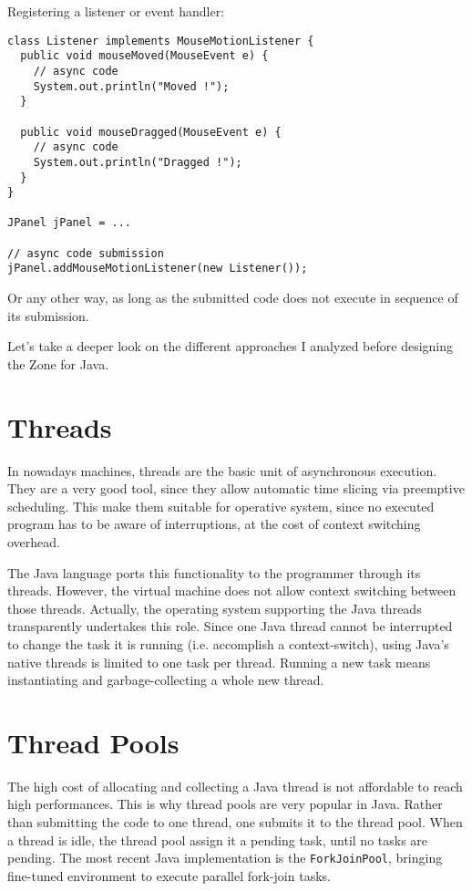 Registering a listener or event handler:
\begin{lstlisting}
class Listener implements MouseMotionListener {
  public void mouseMoved(MouseEvent e) {
    // async code
    System.out.println("Moved !");
  }

  public void mouseDragged(MouseEvent e) {
    // async code
    System.out.println("Dragged !");
  }
}

JPanel jPanel = ...

// async code submission
jPanel.addMouseMotionListener(new Listener());
\end{lstlisting}

Or any other way, as long as the submitted code does not execute in sequence of its submission.

Let's take a deeper look on the different approaches I analyzed before designing the Zone for Java.


\section{Threads}

In nowadays machines, threads are the basic unit of asynchronous execution. They are a very good tool, since they allow automatic time slicing via preemptive scheduling. This make them suitable for operative system, since no executed program has to be aware of interruptions, at the cost of context switching overhead.

The Java language ports this functionality to the programmer through its threads. However, the virtual machine does not allow context switching between those threads. Actually, the operating system supporting the Java threads transparently undertakes this role. Since one Java thread cannot be interrupted to change the task it is running (i.e. accomplish a context-switch), using Java's native threads is limited to one task per thread. Running a new task means instantiating and garbage-collecting a whole new thread.

\section{Thread Pools}

The high cost of allocating and collecting a Java thread is not affordable to reach high performances. This is why thread pools are very popular in Java. Rather than submitting the code to one thread, one submits it to the thread pool. When a thread is idle, the thread pool assign it a pending task, until no tasks are pending. The most recent Java implementation is the \lstinline{ForkJoinPool}, bringing fine-tuned environment to execute parallel fork-join tasks.

